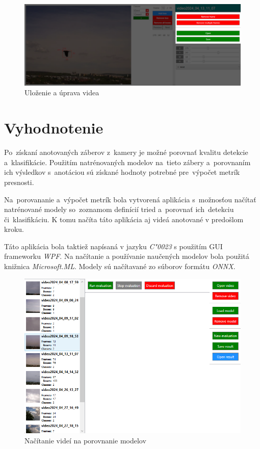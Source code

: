         \begin{figure}[H]
            \centering
            \includegraphics[width=\textwidth]{obrazky/video_annotator/video_controls.png}
            \caption{Uloženie a úprava videa}
        \end{figure}

    \section{Vyhodnotenie}
        Po~získaní anotovaných záberov z~kamery je možné porovnať kvalitu detekcie a~klasifikácie. Použitím natrénovaných modelov na~tieto zábery a~porovnaním ich výsledkov s~anotáciou sú získané hodnoty potrebné pre~výpočet metrík presnosti.

        Na~porovananie a~výpočet metrík bola vytvorená aplikácia s~možnosťou načítať natrénované modely so~zoznamom definícií tried a~porovnať ich~detekciu či~klasifikáciu. K tomu načíta táto aplikácia aj videá anotované v predošlom kroku.

        Táto aplikácia bola taktiež napísaná v jazyku \emph{C\char"0023} s použitím \ac{GUI} frameworku \emph{WPF}. Na načítanie a používanie naučených modelov bola použitá knižnica \emph{Microsoft.ML}. Modely sú načítavané zo súborov formátu \emph{ONNX}.

        \begin{figure}[H]
            \centering
            \includegraphics[width=.8\textwidth]{obrazky/evaluator/open videos.png}
            \caption{Načítanie videí na porovnanie modelov}
        \end{figure}

